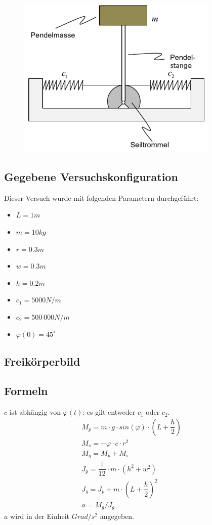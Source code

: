 \documentclass[]{scrartcl}
\begin{document}
\begin{figure}[H]
\centering
\includegraphics[width=0.5\linewidth]{./3_Versuchsaufbau}
\caption{}
\label{fig:3_Versuchsaufbau}
\end{figure}

\subsection{Gegebene Versuchskonfiguration}
Dieser Versuch wurde mit folgenden Parametern durchgeführt:
\begin{itemize}
\item $L = 1m$
\item $m = 10kg$
\item $r = 0.3m$
\item $w = 0.3m$
\item $h = 0.2m$
\item $c_{1} = 5000 N/m$
\item $c_{2} = 500\ 000N/m$
\item $\varphi(0) = 45^\circ$
\end{itemize}

\subsection{Freikörperbild}

\subsection{Formeln}
$c$ ist abhängig von $\varphi(t)$: es gilt entweder $c_{1}$ oder $c_{2}$.
\begin{align}
M_{p} = m \cdot g \cdot sin(\varphi) \cdot (L + \dfrac{h}{2})\\
M_{s} = -\varphi \cdot c \cdot r^2\\
M_{g} = M_{p} + M_{s}\\
J_{p} = \dfrac{1}{12} \cdot m \cdot (h^2 + w^2)\\
J_{g} = J_{p} + m \cdot (L + \dfrac{h}{2})^2\\
a = M_{g}/J_{g}
\end{align}
$a$ wird in der Einheit $Grad/s^2$ angegeben.
\end{document}
